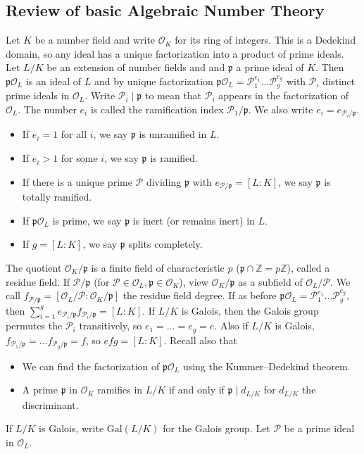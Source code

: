\documentclass{article}
\theoremstyle{definition}
\begin{document}
\subsection{Review of basic Algebraic Number Theory}
Let $K$ be a number field and write $\mathcal{O}_K$ for its ring of integers. This is a Dedekind domain, so any ideal has a unique factorization into a product of prime ideals. Let $L/K$ be an extension of number fields and and $\mathfrak{p}$ a prime ideal of $K$. Then $\mathfrak{p}\mathcal{O}_L$ is an ideal of $L$ and by unique factorization $\mathfrak{p}\mathcal{O}_L = \mathcal{P}_1^{e_1}\ldots \mathcal{P}_g^{e_g}$ with $\mathcal{P}_i$ distinct prime ideals in $\mathcal{O}_L$. Write $\mathcal{P}_i \mid \mathfrak{p}$ to mean that $\mathcal{P}_i$ appears in the factorization of $\mathcal{O}_L$. The number $e_i$ is called the ramification index $\mathcal{P}_1/\mathfrak{p}$. We also write $e_i = e_{\mathcal{P}_i/\mathfrak{p}}$. 
\begin{itemize}
    \item If $e_i=1$ for all $i$, we say $\mathfrak{p}$ is unramified in $L$.
    \item If $e_i>1$ for some $i$, we say $\mathfrak{p}$ is ramified.
    \item If there is a unique prime $\mathcal{P}$ dividing $\mathfrak{p}$ with $e_{\mathcal{P}/\mathfrak{p}} = [L:K]$, we say $\mathfrak{p}$ is totally ramified.
    \item If $\mathfrak{p}\mathcal{O}_L$ is prime, we say $\mathfrak{p}$ is inert (or remains inert) in $L$.
    \item If $g = [L:K]$, we say $\mathfrak{p}$ splits completely.
\end{itemize}
The quotient $\mathcal{O}_K/\mathfrak{p}$ is a finite field of characteristic $p$ ($\mathfrak{p} \cap \mathbb{Z} = p\mathbb{Z}$), called a residue field. If $\mathcal{P}/\mathfrak{p}$ (for $\mathcal{P} \in \mathcal{O}_L, \mathfrak{p} \in \mathcal{O}_K$), view $\mathcal{O}_K/\mathfrak{p}$ as a subfield of $\mathcal{O}_L/\mathcal{P}$. We call $f_{\mathcal{P}/\mathfrak{p}} = [\mathcal{O}_L/\mathcal{P} : \mathcal{O}_K/\mathfrak{p}]$ the residue field degree. If as before $\mathfrak{p}\mathcal{O}_L = \mathcal{P}_1^{e_1}\ldots \mathcal{P}_g^{e_g}$, then $\sum_{i=1}^{g} e_{\mathcal{P}_i/\mathfrak{p}} f_{\mathcal{P}_i/\mathfrak{p}} = [L:K]$. If $L/K$ is Galois, then the Galois group permutes the $\mathcal{P}_i$ transitively, so $e_1 = \ldots = e_g = e$. Also if $L/K$ is Galois, $f_{\mathcal{P}_1/\mathfrak{p}} = \ldots f_{\mathcal{P}_g/\mathfrak{p}} = f$, so $efg = [L:K]$. Recall also that 
\begin{itemize}
    \item We can find the factorization of $\mathfrak{p}\mathcal{O}_L$ using the Kummer--Dedekind theorem.
    \item A prime $\mathfrak{p}$ in $\mathcal{O}_K$ ramifies in $L/K$ if and only if $\mathfrak{p} \mid d_{L/K}$ for $d_{L/K}$ the discriminant.
\end{itemize}
If $L/K$ is Galois, write $\text{Gal}(L/K)$ for the Galois group. Let $\mathcal{P}$ be a prime ideal in $\mathcal{O}_L$.
\end{document}
